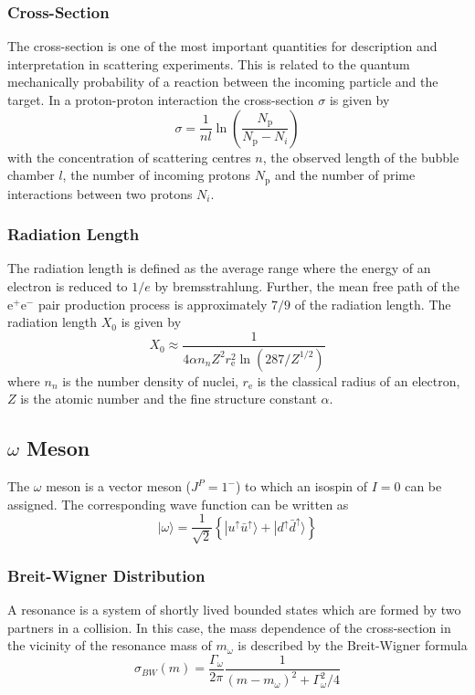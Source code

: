 \documentclass[10pt, a4paper, notitlepage, DIV=15]{scrartcl}
\begin{document}
\subsubsection{Cross-Section}
 The cross-section is one of the most important quantities for description and interpretation in scattering experiments. This is related to the quantum mechanically probability of a reaction between the incoming particle and the target. In a proton-proton interaction the cross-section $\sigma$ is given by \cite{description}
 \begin{equation}
 	\sigma=\frac{1}{nl}\ln\left(\frac{N_\text{p}}{N_\text{p}-N_i} \right) 
 \end{equation}
 with the concentration of scattering centres $n$, the observed length of the bubble chamber $l$, the number of incoming protons $N_\text{p}$ and the number of prime interactions between two protons $N_i$. \cite{martin}
\subsubsection{Radiation Length}
The radiation length is defined as the average range where the energy of an electron is reduced to $1/e$ by bremsstrahlung. Further, the mean free path of the e$^+$e$^-$ pair production process is approximately $7/9$ of the radiation length. The radiation length $X_0$ is given by \cite{thomson}
\begin{equation}
	X_0\approx\frac{1}{4\alpha n_n Z^2r_\text{e}^2\ln\left(287/Z^{1/2} \right) }
\end{equation}
where $n_n$ is the number density of nuclei, $r_\text{e}$ is the classical radius of an electron, $Z$ is the atomic number and the fine structure constant $\alpha$. \cite{thomson}
\subsection{$\omega$ Meson}
The $\omega$ meson is a vector meson ($J^P=1^-$) to which an isospin of $I=0$ can be assigned. The corresponding wave function can be written as \cite{povh}
\begin{equation}
	|\omega \rangle = \frac{1}{\sqrt{2}}\left\lbrace|u^\uparrow \bar{u}^\uparrow \rangle + |d^\uparrow \bar{d}^\uparrow \rangle\right\rbrace 
\end{equation}
\subsubsection{Breit-Wigner Distribution}
A resonance is a system of shortly lived bounded states which are formed by two partners in a collision. In this case, the mass dependence of the cross-section in the vicinity of the resonance mass of  $m_\omega$ is described by the Breit-Wigner formula \cite{description}
\begin{equation}
	\sigma_{BW}(m)=  \frac{\Gamma_\omega}{2\pi}\frac{1}{(m-m_\omega)^2+\Gamma_\omega^2/4}
\end{equation}
\end{document}
